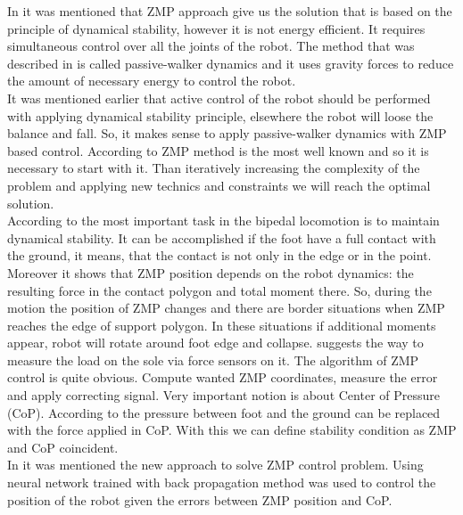 \documentclass[11pt,a4paper]{article}
\begin{document}
In \cite{manchester2011stable} it was mentioned that ZMP approach give us the solution that is based on the principle of dynamical stability, however it is not energy efficient. It requires simultaneous control over all the joints of the robot. The method that was described in \cite{collins2001three} is called passive-walker dynamics and it uses gravity forces to reduce the amount of necessary energy to control the robot.\\
It was mentioned earlier that active control of the robot should be performed with applying dynamical stability principle, elsewhere the robot will loose the balance and fall. So, it makes sense to apply passive-walker dynamics with ZMP based control. According to \cite{vukobratovic2004zero} ZMP method is the most well known and so it is necessary to start with it. Than iteratively increasing the complexity of the problem and applying new technics and constraints we will reach the optimal solution.\\
According to \cite{vukobratovic2004zero} the most important task in the bipedal locomotion is to maintain dynamical stability. It can be accomplished if the foot have a full contact with the ground, it means, that the contact is not only in the edge or in the point. Moreover it shows that ZMP position depends on the robot dynamics: the resulting force in the contact polygon and total moment there. So, during the motion the position of ZMP changes and there are border situations when ZMP reaches the edge of support polygon. In these situations if additional moments appear, robot will rotate around foot edge and collapse. \cite{vukobratovic2004zero} suggests the way to measure the load on the sole via force sensors on it. The algorithm of ZMP control is quite obvious. Compute wanted ZMP coordinates, measure the error and apply correcting signal. Very important notion is about Center of Pressure (CoP). According to \cite{vukobratovic2004zero} the pressure between foot and the ground can be replaced with the force applied in CoP. With this we can define stability condition as ZMP and CoP coincident.\\
In \cite{kim2012zmp} it was mentioned the new approach to solve ZMP control problem. Using neural network trained with back propagation method was used to control the position of the robot given the errors between ZMP position and CoP.
\newpage



  
\end{document}
